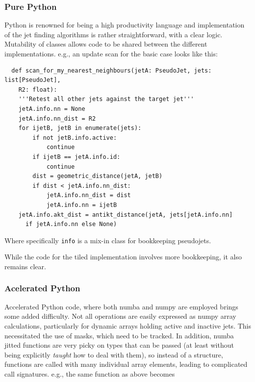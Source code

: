\documentclass{webofc}
\begin{document}
\subsubsection{Pure Python}

Python is renowned for being a high productivity language and implementation of
the jet finding algorithms is rather straightforward, with a clear logic.
Mutability of classes allows code to be shared between the different
implementations. e.g., an update scan for the basic case looks like this:

\begin{verbatim}
  def scan_for_my_nearest_neighbours(jetA: PseudoJet, jets: list[PseudoJet], 
    R2: float):
    '''Retest all other jets against the target jet'''
    jetA.info.nn = None
    jetA.info.nn_dist = R2
    for ijetB, jetB in enumerate(jets):
        if not jetB.info.active:
            continue
        if ijetB == jetA.info.id:
            continue
        dist = geometric_distance(jetA, jetB)
        if dist < jetA.info.nn_dist:
            jetA.info.nn_dist = dist
            jetA.info.nn = ijetB
    jetA.info.akt_dist = antikt_distance(jetA, jets[jetA.info.nn] 
      if jetA.info.nn else None)
\end{verbatim}

Where specifically \texttt{info} is a mix-in class for bookkeeping pseudojets.

While the code for the tiled implementation involves more bookkeeping, it also remains clear.

\subsubsection{Acelerated Python}

Accelerated Python code, where both numba and numpy are employed brings some
added difficulty. Not all operations are easily expressed as numpy array
calculations, particularly for dynamic arrays holding active and inactive jets.
This necessitated the use of masks, which need to be tracked. In addition, numba
jitted functions are very picky on types that can be passed (at least without
being explicitly \emph{taught} how to deal with them), so instead of a
structure, functions are called with many individual array elements, leading to
complicated call signatures. e.g., the same function as above becomes
\end{document}
